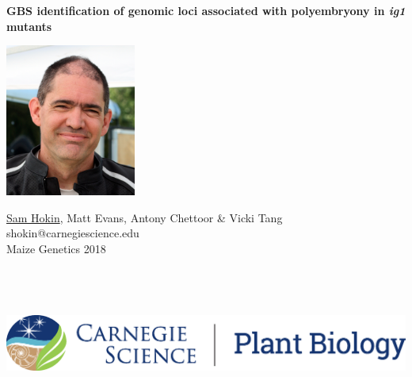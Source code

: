 \documentclass[a0,25pt]{sciposter}
\begin{document}


\textbf{\color{CarnegiePriBlue} \Huge GBS identification of genomic loci associated with polyembryony in \textit{ig1} mutants}    %

\begin{minipage}[m]{0.06\linewidth}
  \includegraphics[height=50mm]{sam-bfr-smiling-crop.jpg} %
  \hfill
\end{minipage}
\begin{minipage}[m]{0.46\linewidth}                      %
  \raggedright
  \color{Black}
  \Large \underline{Sam Hokin}, Matt Evans, Antony Chettoor \& Vicki Tang \\
  \vspace{2mm}
  \large shokin@carnegiescience.edu \\
  \vspace{4mm}
  \Large Maize Genetics 2018
\end{minipage}
\hfill
\begin{minipage}[m]{0.47\linewidth}                      %
  \hfill
  \includegraphics[height=50mm]{CS_plantbio_logo_horz.eps} 
\end{minipage}
\end{document}
